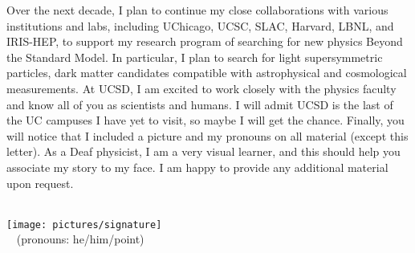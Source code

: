 \documentclass[10pt,letterpaper,sans]{moderncv} %
\makeatletter
\renewcommand*{\makeletterclosing}{
  \@closing\\[0.5em]%
  \texttt{[image: pictures/signature]}\\%
  {\bfseries \@firstname~\@lastname} (pronouns: he/him/point)%
  \ifthenelse{\isundefined{\@enclosure}}{}{%
    \\%
    \vfill%
    {\color{color2}\itshape\enclname: \@enclosure}}}
\makeatother
\begin{document}
Over the next decade, I plan to continue my close collaborations with various institutions and labs, including UChicago, UCSC, SLAC, Harvard, LBNL, and IRIS-HEP, to support my research program of searching for new physics Beyond the Standard Model. In particular, I plan to search for light supersymmetric particles, dark matter candidates compatible with astrophysical and cosmological measurements. At UCSD, I am excited to work closely with the physics faculty and know all of you as scientists and humans. I will admit UCSD is the last of the UC campuses I have yet to visit, so maybe I will get the chance. Finally, you will notice that I included a picture and my pronouns on all material (except this letter). As a Deaf physicist, I am a very visual learner, and this should help you associate my story to my face. I am happy to provide any additional material upon request.

\makeletterclosing
\end{document}
